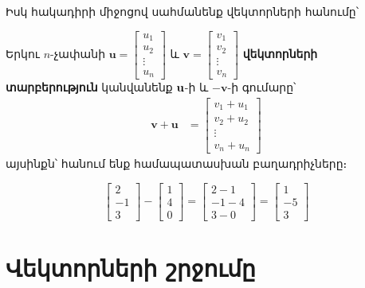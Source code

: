 Իսկ հակադիրի միջոցով սահմանենք վեկտորների հանումը՝
\begin{definition}
Երկու $n$-չափանի  \( \mathbf{u} = \begin{bmatrix} u_1 \\ u_2 \\ \vdots \\ u_n \end{bmatrix} \) և  \( \mathbf{v} = \begin{bmatrix} v_1 \\ v_2 \\ \vdots \\ v_n \end{bmatrix} \) 
\textbf{վեկտոր\-ների տարբերություն} կանվանենք $\mathbf{u}$-ի և $-\mathbf{v}$-ի գումարը՝
  \begin{align*}
    \mathbf{v} + \mathbf{u} &= \begin{bmatrix} v_1 + u_1 \\ v_2 + u_2 \\ \vdots \\ v_n + u_n \end{bmatrix}
  \end{align*}
այսինքն՝ հանում ենք համապատասխան բաղադրիչները։
\end{definition}


\begin{example}
    \[
    \begin{bmatrix} 2 \\ -1 \\ 3 \end{bmatrix} - \begin{bmatrix} 1 \\ 4 \\ 0 \end{bmatrix} = \begin{bmatrix} 2 - 1 \\ -1 - 4 \\ 3 - 0 \end{bmatrix} = \begin{bmatrix} 1 \\ -5 \\ 3 \end{bmatrix}
    \]
\end{example}


\section{Վեկտորների շրջումը}

